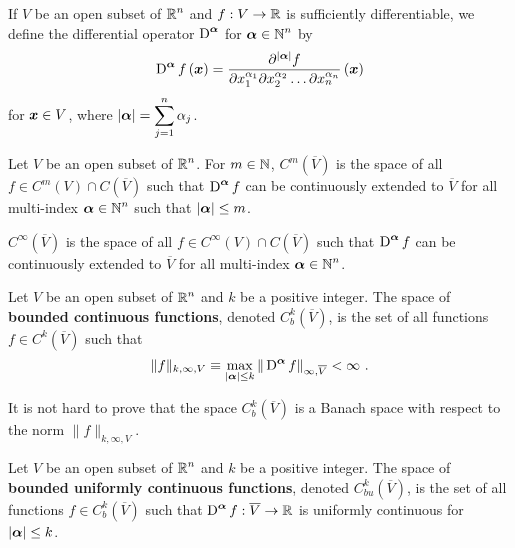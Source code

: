 If $V$ be an open subset of $\displaystyle \mathbb{R}^n$ and $f:V \to \mathbb{R}$ is
sufficiently differentiable, we define the differential operator
$\displaystyle \operatorname{D}^{{\bm{\alpha}}}$ for $\displaystyle {\bm{\alpha}} \in \mathbb{N}^n$
by
\[
\operatorname{D}^{{\bm{\alpha}}} f\left({\bm{x}}\right)
= \frac{\partial^{|{\bm{\alpha}}|} f}{\partial x_1^{\alpha_1}
\partial x_2^{\alpha_2} \ldots \partial x_n^{\alpha_n}}\left({\bm{x}}\right)
\]
for ${\bm{x}} \in V$, where
$\displaystyle |{\bm{\alpha}}| = \sum_{j=1}^n \alpha_j$.

\begin{defn*}
Let $V$ be an open subset of $\displaystyle \mathbb{R}^n$.  For $m\in \mathbb{N}$,
$\displaystyle C^m(\overline{V})$ is the space of all
$\displaystyle f \in C^m(V) \cap C(\overline{V})$ such that
$\displaystyle \operatorname{D}^{{\bm{\alpha}}} f$ can be continuously extended
to $\overline{V}$ for
all multi-index $\displaystyle {\bm{\alpha}} \in \mathbb{N}^n$ such that
$|{\bm{\alpha}}|\leq m$.

$\displaystyle C^\infty(\overline{V})$ is the space of all
$\displaystyle f \in C^\infty(V) \cap C(\overline{V})$ such that
$\displaystyle \operatorname{D}^{{\bm{\alpha}}} f$ can be continuously extended to
$\overline{V}$ for all multi-index $\displaystyle {\bm{\alpha}} \in \mathbb{N}^n$.
\end{defn*}

\begin{defn*}
Let $V$ be an open subset of $\displaystyle \mathbb{R}^n$ and $k$ be a
positive integer.  The space of {\bfseries bounded continuous
functions}, denoted
$\displaystyle C_b^k(\overline{V})$, is the set of all functions
$\displaystyle f\in C^k\left(\overline{V}\right)$ such that
\[
\|f\|_{k,\infty,V} \equiv \max_{|\VEC{\alpha}|\leq k}
\|\diff^{\VEC{\alpha}} f\|_{\infty,\overline{V}} < \infty \ .
\]
\end{defn*}

It is not hard to prove that the space
$\displaystyle C^k_b(\overline{V})$ is a Banach space
with respect to the norm $\displaystyle \|f\|_{k,\infty,V}$.

\begin{defn*}
Let $V$ be an open subset of $\displaystyle \mathbb{R}^n$ and $k$ be a
positive integer.  The space of {\bfseries bounded uniformly continuous
functions}, denoted
$\displaystyle C_{bu}^k(\overline{V})$, is the set of all functions
$\displaystyle f\in C_b^k\left(\overline{V}\right)$ such that
$\displaystyle \operatorname{D}^{{\bm{\alpha}}} f:\overline{V} \to \mathbb{R}$ is uniformly
continuous for $|{\bm{\alpha}}| \leq k$.
\end{defn*}

